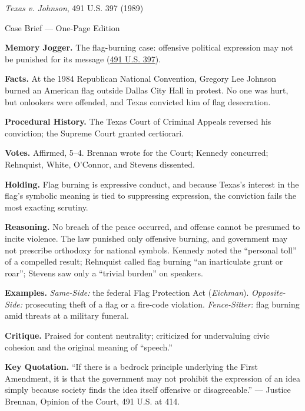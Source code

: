 \documentclass[12pt]{article}
\begin{document}
\begin{center}
{\Large \textit{Texas v. Johnson}, 491 U.S. 397 (1989)\par}
\vspace{0.3em}
{\normalsize Case Brief --- One-Page Edition\par}
\end{center}

\textbf{Memory Jogger.} The flag-burning case: offensive political expression may not be punished for its message (\href{https://www.courtlistener.com/opinion/112304/texas-v-johnson/}{491 U.S. 397}).

\textbf{Facts.} At the 1984 Republican National Convention, Gregory Lee Johnson burned an American flag outside Dallas City Hall in protest. No one was hurt, but onlookers were offended, and Texas convicted him of flag desecration.

\textbf{Procedural History.} The Texas Court of Criminal Appeals reversed his conviction; the Supreme Court granted certiorari.

\textbf{Votes.} Affirmed, 5--4. Brennan wrote for the Court; Kennedy concurred; Rehnquist, White, O'Connor, and Stevens dissented.

\textbf{Holding.} Flag burning is expressive conduct, and because Texas's interest in the flag's symbolic meaning is tied to suppressing expression, the conviction fails the most exacting scrutiny.

\textbf{Reasoning.} No breach of the peace occurred, and offense cannot be presumed to incite violence. The law punished only offensive burning, and government may not prescribe orthodoxy for national symbols. Kennedy noted the ``personal toll'' of a compelled result; Rehnquist called flag burning ``an inarticulate grunt or roar''; Stevens saw only a ``trivial burden'' on speakers.

\textbf{Examples.} \emph{Same-Side:} the federal Flag Protection Act (\textit{Eichman}). \emph{Opposite-Side:} prosecuting theft of a flag or a fire-code violation. \emph{Fence-Sitter:} flag burning amid threats at a military funeral.

\textbf{Critique.} Praised for content neutrality; criticized for undervaluing civic cohesion and the original meaning of ``speech.''

\textbf{Key Quotation.} ``If there is a bedrock principle underlying the First Amendment, it is that the government may not prohibit the expression of an idea simply because society finds the idea itself offensive or disagreeable.'' --- Justice Brennan, Opinion of the Court, 491 U.S. at 414.
\end{document}

